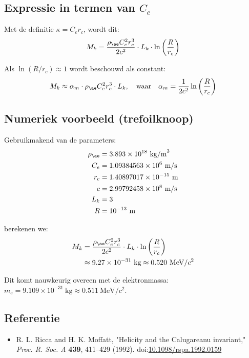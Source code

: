 \subsection{Expressie in termen van \( C_e \)}
Met de definitie \( \kappa = C_e r_c \), wordt dit:
\begin{equation}
    M_k = \frac{\rho_{\ae} C_e^2 r_c^3}{2 c^2} \cdot L_k \cdot \ln\left( \frac{R}{r_c} \right)
\end{equation}

Als \( \ln(R/r_c) \approx 1 \) wordt beschouwd als constant:
\begin{equation}
    M_k \approx \alpha_m \cdot \rho_{\ae} C_e^2 r_c^3 \cdot L_k, \quad \text{waar} \quad \alpha_m = \frac{1}{2c^2} \ln\left( \frac{R}{r_c} \right)
\end{equation}

\subsection*{Numeriek voorbeeld (trefoilknoop)}
Gebruikmakend van de parameters:
\begin{align*}
    \rho_{\ae} &= 3.893 \times 10^{18}~\text{kg/m}^3 \\
    C_e &= 1.09384563 \times 10^6~\text{m/s} \\
    r_c &= 1.40897017 \times 10^{-15}~\text{m} \\
    c &= 2.99792458 \times 10^8~\text{m/s} \\
    L_k &= 3 \\
    R &= 10^{-13}~\text{m}
\end{align*}

berekenen we:
\begin{align*}
    M_k &= \frac{\rho_{\ae} C_e^2 r_c^3}{2 c^2} \cdot L_k \cdot \ln\left( \frac{R}{r_c} \right) \\
    &\approx 9.27 \times 10^{-31}~\text{kg} \approx 0.520~\text{MeV}/c^2
\end{align*}

Dit komt nauwkeurig overeen met de elektronmassa: \( m_e = 9.109 \times 10^{-31}~\text{kg} \approx 0.511~\text{MeV}/c^2 \).

\subsection*{Referentie}
\begin{itemize}
    \item R. L. Ricca and H. K. Moffatt, "Helicity and the Calugareanu invariant," \textit{Proc. R. Soc. A} \textbf{439}, 411--429 (1992). doi:\href{https://doi.org/10.1098/rspa.1992.0159}{10.1098/rspa.1992.0159}
\end{itemize}
